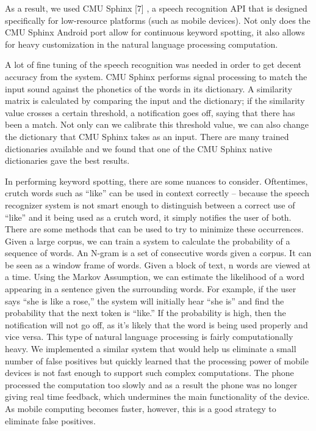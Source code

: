 \documentclass{sigchi}
\begin{document}
As a result, we used CMU Sphinx [7]	, a speech recognition API that is designed specifically for low-resource platforms (such as mobile devices). Not only does the CMU Sphinx Android port allow for continuous keyword spotting, it also allows for heavy customization in the natural language processing computation. 

A lot of fine tuning of the speech recognition was needed in order to get decent accuracy from the system. CMU Sphinx performs signal processing to match the input sound against the phonetics of the words in its dictionary. A similarity matrix is calculated by comparing the input and the dictionary; if the similarity value crosses a certain threshold, a notification goes off, saying that there has been a match. Not only can we calibrate this threshold value, we can also change the dictionary that CMU Sphinx takes as an input. There are many trained dictionaries available and we found that one of the CMU Sphinx native dictionaries gave the best results.

In performing keyword spotting, there are some nuances to consider. Oftentimes, crutch words such as “like” can be used in context correctly -- because the speech recognizer system is not smart enough to distinguish between a correct use of “like” and it being used as a crutch word, it simply notifies the user of both. There are some methods that can be used to try to minimize these occurrences. Given a large corpus, we can train a system to calculate the probability of a sequence of words. An N-gram is a set of consecutive words given a corpus. It can be seen as a window frame of words. Given a block of text, n words are viewed at a time. Using the Markov Assumption, we can estimate the likelihood of a word appearing in a sentence given the surrounding words. For example, if the user says “she is like a rose,” the system will initially hear “she is” and find the probability that the next token is “like.” If the probability is high, then the notification will not go off, as it’s likely that the word is being used properly and vice versa. This type of natural language processing is fairly computationally heavy. We implemented a similar system that would help us eliminate a small number of false positives but quickly learned that the processing power of mobile devices is not fast enough to support such complex computations. The phone processed the computation too slowly and as a result the phone was no longer giving real time feedback, which undermines the main functionality of the device. As mobile computing becomes faster, however, this is a good strategy to eliminate false positives.
\end{document}
